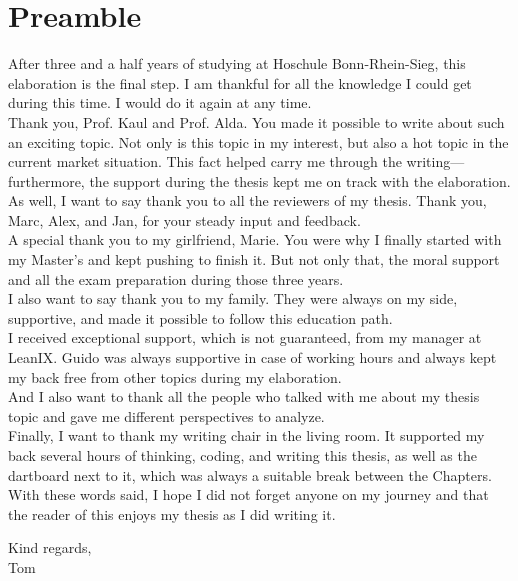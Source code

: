 \section*{Preamble}
After three and a half years of studying at Hoschule Bonn-Rhein-Sieg, this elaboration is the final step. I am thankful for all the knowledge I could get during this time. I would do it again at any time. \\ 

Thank you, Prof. Kaul and Prof. Alda. You made it possible to write about such an exciting topic. Not only is this topic in my interest, but also a hot topic in the current market  situation. This fact helped carry me through the writing—furthermore, the support during the thesis kept me on track with the elaboration. \\
As well, I want to say thank you to all the reviewers of my thesis. Thank you, Marc, Alex, and Jan, for your steady input and feedback. \\
A special thank you to my girlfriend, Marie. You were why I finally started with my Master's and kept pushing to finish it. But not only that, the moral support and all the exam preparation during those three years. \\
I also want to say thank you to my family. They were always on my side, supportive, and made it possible to follow this education path. \\
I received exceptional support, which is not guaranteed, from my manager at LeanIX. Guido was always supportive in case of working hours and always kept my back free from other topics during my elaboration. \\
And I also want to thank all the people who talked with me about my thesis topic and gave me different perspectives to analyze. \\
Finally, I want to thank my writing chair in the living room. It supported my back several hours of thinking, coding, and writing this thesis, as well as the dartboard next to it, which was always a suitable break between the Chapters.\\

With these words said, I hope I did not forget anyone on my journey and that the reader of this enjoys my thesis as I did writing it. \\

\begin{flushright}
Kind regards,\\
Tom
\end{flushright}
